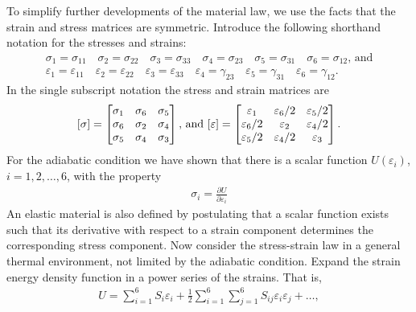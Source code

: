 \documentclass{AeroStructure-ERJohnson}
\begin{document}
To simplify further developments of the material law, we use the facts that the strain and stress matrices are symmetric. Introduce the following shorthand notation for the stresses and strains:
\begin{gather}\label{eqA.111}
\sigma_{1}=\sigma_{11} \quad \sigma_{2}=\sigma_{22} \quad \sigma_{3}=\sigma_{33} \quad \sigma_{4}=\sigma_{23} \quad \sigma_{5}=\sigma_{31} \quad \sigma_{6}=\sigma_{12}\mbox{, and}\\
\varepsilon_{1}=\varepsilon_{11} \quad \varepsilon_{2}=\varepsilon_{22} \quad \varepsilon_{3}=\varepsilon_{33} \quad \varepsilon_{4}=\gamma_{23} \quad \varepsilon_{5}=\gamma_{31} \quad \varepsilon_{6}=\gamma_{12}.\label{eqA.112}
\end{gather}
In the single subscript notation the stress and strain matrices are
\begin{align}\label{eqA.113}
[\sigma]=\left[\begin{array}{@{}lll@{}}\sigma_{1} & \sigma_{6} & \sigma_{5} \\\sigma_{6} & \sigma_{2} & \sigma_{4} \\\sigma_{5} & \sigma_{4} & \sigma_{3}\end{array}\right]\mbox{, and }[\varepsilon]=\left[\begin{array}{@{}ccc@{}}\varepsilon_{1} & \varepsilon_{6} / 2 & \varepsilon_{5} / 2 \\\varepsilon_{6} / 2 & \varepsilon_{2} & \varepsilon_{4} / 2 \\\varepsilon_{5} / 2 & \varepsilon_{4} / 2 & \varepsilon_{3}\end{array}\right].
\end{align}
For the adiabatic condition we have shown that there is a scalar function $U(\varepsilon_{i})$, $i=1,2, \ldots, 6$, with the property
\begin{align}\label{eqA.114}
\sigma_{i}=\frac{\partial U}{\partial \varepsilon_{i}}
\end{align}
An elastic material is also defined by postulating that a scalar function exists such that its derivative with respect to a strain component determines the corresponding stress component. Now consider the stress-strain law in a general thermal environment, not limited by the adiabatic condition. Expand the strain energy density function in a power series of the strains. That is,
\begin{align}\label{eqA.115}
U=\sum_{i=1}^6 S_{i} \varepsilon_{i}+\frac{1}{2} \sum_{i=1}^6\sum_{j=1}^6 S_{i j} \varepsilon_{i} \varepsilon_{j}+\ldots,
\end{align}
\end{document}

